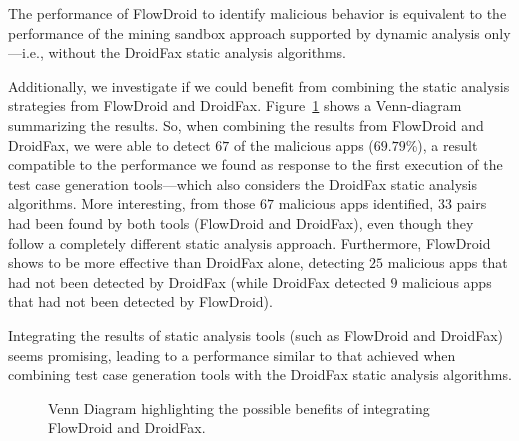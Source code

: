 \begin{finding}
  The performance of FlowDroid to identify malicious behavior
  is equivalent to the performance of the
  mining sandbox approach supported by dynamic analysis only---i.e., without
  the DroidFax static analysis algorithms.
\end{finding}

Additionally, we investigate if we could benefit from combining the
static analysis strategies from FlowDroid and DroidFax. Figure~\ref{fig:venn-plot2} shows a
Venn-diagram summarizing the results. So, when combining
the results from FlowDroid and DroidFax, we were able to detect
$67$ of the malicious apps ($69.79$\%), a result compatible
to the performance we found as response to the first execution of the
test case generation tools---which also considers the DroidFax
static analysis algorithms. More interesting, from those $67$
malicious apps identified, $33$ pairs had been found by
both tools (FlowDroid and DroidFax), even though they follow
a completely different static analysis approach. Furthermore,
FlowDroid shows to be more effective than DroidFax alone, detecting $25$ malicious
apps that had not been detected by DroidFax (while DroidFax detected $9$
malicious apps that had not been detected by FlowDroid).

\begin{finding}
  Integrating the results of static analysis tools
  (such as FlowDroid and DroidFax) seems promising,
  leading to a performance similar to that achieved
  when combining test case generation tools with the
  DroidFax static analysis algorithms. 
\end{finding}

\begin{figure}
  \caption{Venn Diagram highlighting the possible benefits of
    integrating FlowDroid and DroidFax.}
  \label{fig:venn-plot2}

\end{figure}

